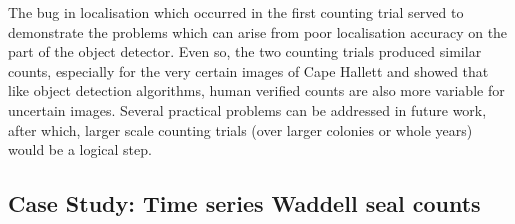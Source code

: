 The bug in localisation which occurred in the first counting trial served to demonstrate the problems which can arise from poor localisation accuracy on the part of the object detector. Even so, the two counting trials produced similar counts, especially for the very certain images of Cape Hallett and showed that like object detection algorithms, human verified counts are also more variable for uncertain images. Several practical problems can be addressed in future work, after which, larger scale counting trials (over larger colonies or whole years) would be a logical step.

\subsection{Case Study: Time series Waddell seal counts}
\label{sec:case_seals}



